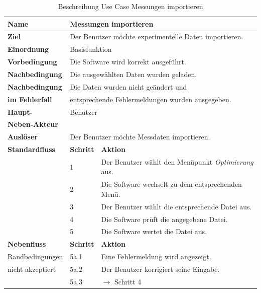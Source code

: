 \begin{table} [H]
	\centering
	\begin{tabular}{|l|l|l|}
		\hline
		\textbf{Name} 			& \multicolumn{2}{|l|}{Messungen importieren}  \\
		\hline
		\textbf{Ziel} 			& \multicolumn{2}{|l|}{Der Benutzer möchte experimentelle Daten importieren. }\\ 
		\hline
		\textbf{Einordnung}		& \multicolumn{2}{|l|}{Basisfunktion}\\
		\hline
		\textbf{Vorbedingung}	& \multicolumn{2}{|l|}{Die Software wird korrekt ausgeführt.} \\
		\hline
		\textbf{Nachbedingung}	& \multicolumn{2}{|l|}{Die ausgewählten Daten wurden geladen.}\\
		\hline
		\textbf{Nachbedingung} 	& \multicolumn{2}{|l|}{Die Daten wurden nicht geändert und}\\
		\textbf{im Fehlerfall}	& \multicolumn{2}{|l|}{entsprechende Fehlermeldungen wurden ausgegeben.}\\
		\hline
		\textbf{Haupt-} 		& \multicolumn{2}{|l|}{Benutzer}\\
		\textbf{Neben-Akteur}	& \multicolumn{2}{|l|}{	}			\\
		\hline
		\textbf{Auslöser} 		& \multicolumn{2}{|l|}{Der Benutzer möchte Messdaten importieren.} \\
		\hline 
		\textbf{Standardfluss} & \textbf{Schritt} & \textbf{Aktion} \\
		\hline
		&	1	& Der Benutzer wählt den Menüpunkt \emph{Optimierung} aus. \\
		\cline{2-3}
		&	2	& Die Software wechselt zu dem entsprechenden Menü.\\
		\cline{2-3}
		&	3	& Der Benutzer wählt die entsprechende Datei aus.\\
		\cline{2-3}
		&	4	& Die Software prüft die angegebene Datei.\\
		\cline{2-3}
		&	5	& Die Software wertet die Datei aus.\\
		\hline
		\textbf{Nebenfluss} & \textbf{Schritt} & \textbf{Aktion}\\
		\hline
		Randbedingungen  & 5a.1 & Eine Fehlermeldung wird angezeigt.\\
		\cline{2-3}
		nicht akzeptiert 	& 5a.2	& Der Benutzer korrigiert seine Eingabe.\\
		\cline{2-3}
		& 5a.3 	& $\rightarrow$ Schritt 4\\
		\hline
	\end{tabular}
	\caption{Beschreibung Use Case Messungen importieren}
	\label{Beschreibung Use Case Messungen importieren}
\end{table}

